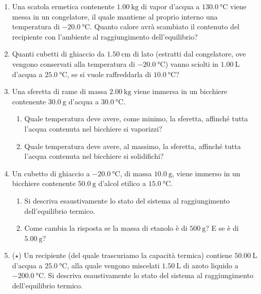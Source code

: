 \begin{enumerate}

    \item Una scatola ermetica contenente $\SI{1,00}{\kg}$ di vapor d'acqua a $\SI{130,0}{\celsius}$ viene messa in un congelatore, il quale mantiene al proprio interno una temperatura di $\SI{-20,0}{\celsius}$. Quanto calore avrà scambiato il contenuto del recipiente con l'ambiente al raggiungimento dell'equilibrio?

    \item Quanti cubetti di ghiaccio da $\SI{1,50}{\centi\meter}$ di lato (estratti dal congelatore, ove vengono conservati alla temperatura di $\SI{-20,0}{\celsius}$) vanno sciolti in $\SI{1,00}{\liter}$ d'acqua a $\SI{25,0}{\celsius}$, se si vuole raffreddarla di $\SI{10,0}{\celsius}$?
    
    \item Una sferetta di rame di massa $\SI{2,00}{\kilo\gram}$ viene immersa in un bicchiere contenente $\SI{30,0}{\gram}$ d'acqua a $\SI{30,0}{\celsius}$.
    \begin{enumerate}
        \item Quale temperatura deve avere, come minimo, la sferetta, affinché tutta l'acqua contenuta nel bicchiere si vaporizzi?
        \item Quale temperatura deve avere, al massimo, la sferetta, affinché tutta l'acqua contenuta nel bicchiere si solidifichi?
    \end{enumerate}
    
    \item Un cubetto di ghiaccio a $\SI{-20,0}{\celsius}$, di massa $\SI{10,0}{\gram}$, viene immerso in un bicchiere contenente $\SI{50,0}{\gram}$ d'alcol etilico a $\SI{15,0}{\celsius}$.
    \begin{enumerate}
        \item Si descriva esaustivamente lo stato del sistema al raggiungimento dell'equilibrio termico.
        \item Come cambia la risposta se la massa di etanolo è di $\SI{500}{\gram}$? E se è di $\SI{5,00}{\gram}$?
    \end{enumerate}
    
    \item ($\star$) Un recipiente (del quale trascuriamo la capacità termica) contiene $\SI{50,00}{\liter}$ d'acqua a $\SI{25,0}{\celsius}$, alla quale vengono miscelati $\SI{1,50}{\liter}$ di azoto liquido a $\SI{-200,0}{\celsius}$. Si descriva esaustivamente lo stato del sistema al raggiungimento dell'equilibrio termico.
\end{enumerate}
